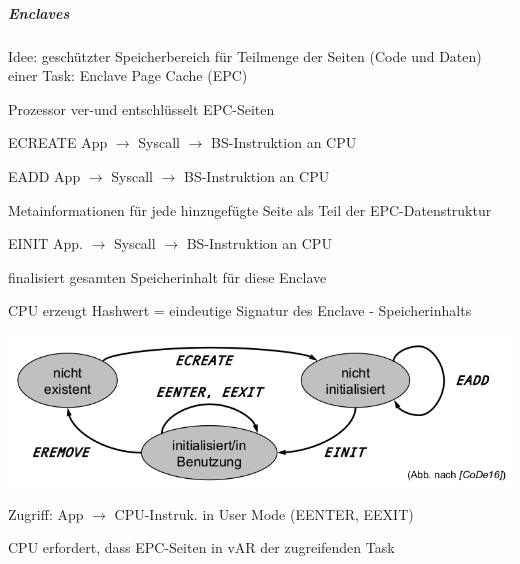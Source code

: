 \documentclass[a4paper]{article}
\begin{document}
\begin{multicols}{3}
    \subparagraph{Enclaves}
    \begin{itemize*}
        \item Idee: geschützter Speicherbereich für Teilmenge der Seiten (Code und Daten) einer Task: Enclave Page Cache (EPC)
        \item Prozessor ver-und entschlüsselt EPC-Seiten
    \end{itemize*}
    \begin{description*}
        \item[ECREATE] App $\rightarrow$ Syscall $\rightarrow$ BS-Instruktion an CPU
        \item[EADD] App $\rightarrow$ Syscall $\rightarrow$ BS-Instruktion an CPU
        \begin{itemize*}
            \item Metainformationen für jede hinzugefügte Seite als Teil der EPC-Datenstruktur
        \end{itemize*}
        \item[EINIT] App. $\rightarrow$ Syscall $\rightarrow$ BS-Instruktion an CPU
        \begin{itemize*}
            \item finalisiert gesamten Speicherinhalt für diese Enclave
            \item CPU erzeugt Hashwert = eindeutige Signatur des Enclave - Speicherinhalts
        \end{itemize*}
    \end{description*}
    \begin{center}
        \includegraphics[width=.6\linewidth]{Assets/AdvancedOperatingSystems-SGX-enclaves-model.png}
    \end{center}
    \begin{itemize*}
        \item Zugriff: App $\rightarrow$ CPU-Instruk. in User Mode (EENTER, EEXIT)
        \item CPU erfordert, dass EPC-Seiten in vAR der zugreifenden Task
    \end{itemize*}


\end{multicols}
\end{document}
